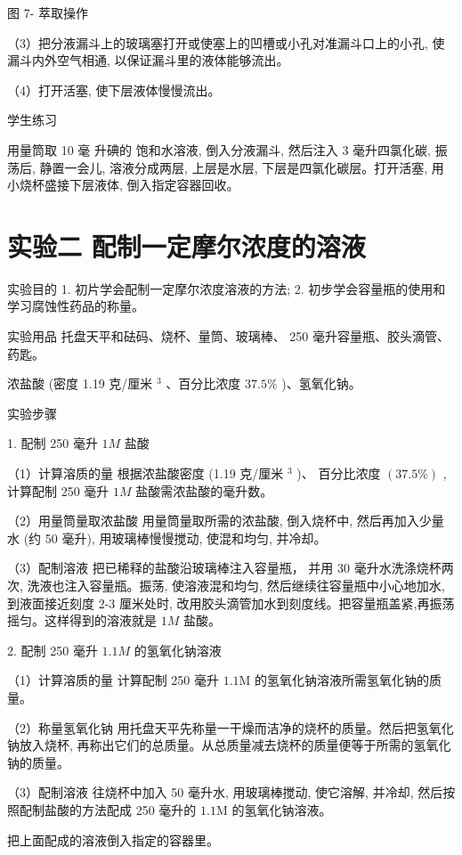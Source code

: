 \documentclass[10pt]{article}
\begin{document}
图 7- 萃取操作

（3）把分液漏斗上的玻璃塞打开或使塞上的凹槽或小孔对准漏斗口上的小孔, 使漏斗内外空气相通, 以保证漏斗里的液体能够流出。

（4）打开活塞, 使下层液体慢慢流出。

学生练习

用量筒取 10 毫 升碘的 饱和水溶液, 倒入分液漏斗, 然后注入 3 毫升四氯化碳, 振荡后, 静置一会儿, 溶液分成两层, 上层是水层, 下层是四氯化碳层。打开活塞, 用小烧杯盛接下层液体, 倒入指定容器回收。

\section*{实验二 配制一定摩尔浓度的溶液}

实验目的 1. 初片学会配制一定摩尔浓度溶液的方法; 2. 初步学会容量瓶的使用和学习腐蚀性药品的称量。

实验用品 托盘天平和砝码、烧杯、量筒、玻璃棒、 250 毫升容量瓶、胶头滴管、药匙。

浓盐酸 (密度 1.19 克/厘米 \({}^{3}\) 、百分比浓度 \({37.5}\%\) )、氢氧化钠。

实验步骤

1. 配制 250 毫升 \({1M}\) 盐酸

（1）计算溶质的量 根据浓盐酸密度 (1.19 克/厘米 \({}^{3}\) )、 百分比浓度 \(\left( {{37.5}\% }\right)\) ,计算配制 250 毫升 \({1M}\) 盐酸需浓盐酸的毫升数。

（2）用量筒量取浓盐酸 用量筒量取所需的浓盐酸, 倒入烧杯中, 然后再加入少量水 (约 50 毫升), 用玻璃棒慢慢搅动, 使混和均匀, 并冷却。

（3）配制溶液 把已稀释的盐酸沿玻璃棒注入容量瓶， 并用 30 毫升水洗涤烧杯两次, 洗液也注入容量瓶。振荡, 使溶液混和均匀, 然后继续往容量瓶中小心地加水, 到液面接近刻度 2-3 厘米处时, 改用胶头滴管加水到刻度线。把容量瓶盖紧,再振荡摇匀。这样得到的溶液就是 \({1M}\) 盐酸。

2. 配制 250 毫升 \({1.1M}\) 的氢氧化钠溶液

（1）计算溶质的量 计算配制 250 毫升 \({1.1}\mathrm{M}\) 的氢氧化钠溶液所需氢氧化钠的质量。

（2）称量氢氧化钠 用托盘天平先称量一干燥而洁净的烧杯的质量。然后把氢氧化钠放入烧杯, 再称出它们的总质量。从总质量减去烧杯的质量便等于所需的氢氧化钠的质量。

（3）配制溶液 往烧杯中加入 50 毫升水, 用玻璃棒搅动, 使它溶解, 并冷却, 然后按照配制盐酸的方法配成 250 毫升的 \({1.1}\mathrm{M}\) 的氢氧化钠溶液。

把上面配成的溶液倒入指定的容器里。
\end{document}
